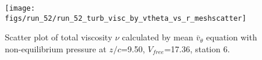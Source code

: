 \begin{figure}[H]
\centering
\texttt{[image: figs/run\_52/run\_52\_turb\_visc\_by\_vtheta\_vs\_r\_meshscatter]}
\caption{Scatter plot of total viscosity $\nu$ calculated by mean $\bar{v}_{\theta}$ equation with non-equilibrium pressure at $z/c$=9.50, $V_{free}$=17.36, station 6.}
\label{fig:run_52_turb_visc_by_vtheta_vs_r_meshscatter}
\end{figure}


